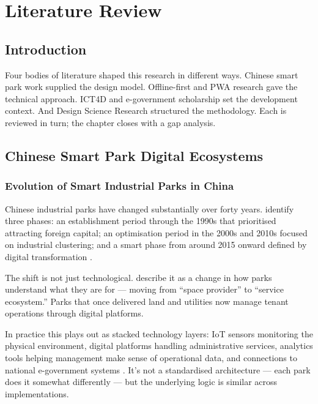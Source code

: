 \chapter{Literature Review}
\label{ch:literature}

\section{Introduction}

Four bodies of literature shaped this research in different ways. Chinese smart park work supplied the design model. Offline-first and PWA research gave the technical approach. ICT4D and e-government scholarship set the development context. And Design Science Research structured the methodology. Each is reviewed in turn; the chapter closes with a gap analysis.

\section{Chinese Smart Park Digital Ecosystems}

\subsection{Evolution of Smart Industrial Parks in China}

Chinese industrial parks have changed substantially over forty years. \citet{Yang2025} identify three phases: an establishment period through the 1990s that prioritised attracting foreign capital; an optimisation period in the 2000s and 2010s focused on industrial clustering; and a smart phase from around 2015 onward defined by digital transformation \citep{Yu2020, Zeng2021, Chen2022}.

The shift is not just technological. \citet{Huang2023} describe it as a change in how parks understand what they are for --- moving from ``space provider'' to ``service ecosystem.'' Parks that once delivered land and utilities now manage tenant operations through digital platforms.

In practice this plays out as stacked technology layers: IoT sensors monitoring the physical environment, digital platforms handling administrative services, analytics tools helping management make sense of operational data, and connections to national e-government systems \citep{Wang2022}. It's not a standardised architecture --- each park does it somewhat differently --- but the underlying logic is similar across implementations.

